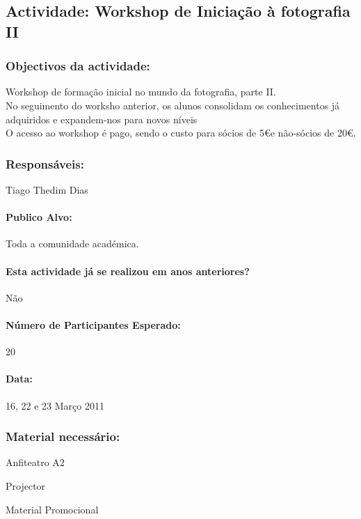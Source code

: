 \subsection{Actividade: Workshop de Iniciação à fotografia II} 

\subsubsection*{Objectivos da actividade:}
\indent Workshop de formação inicial no mundo da fotografia, parte II.\\
\indent No seguimento do worksho anterior, os alunos consolidam os conhecimentos já adquiridos e expandem-nos para novos níveis\\
\indent O acesso ao workshop é pago, sendo o custo para sócios de 5\euro e não-sócios de 20\euro.
\subsubsection*{Responsáveis:}
\begin{itemizedash}
	\item{Tiago Thedim Dias}
\end{itemizedash}

\paragraph{Publico Alvo: }
Toda a comunidade académica.

\paragraph{Esta actividade já se realizou em anos anteriores?}
Não

\paragraph{Número de Participantes Esperado:}
20

\paragraph{Data:} 16, 22 e 23 Março 2011

\subsubsection*{Material necessário:}
\begin{itemizedash}
	\item{Anfiteatro A2}
	\item{Projector}
	\item{Material Promocional}
\end{itemizedash}


